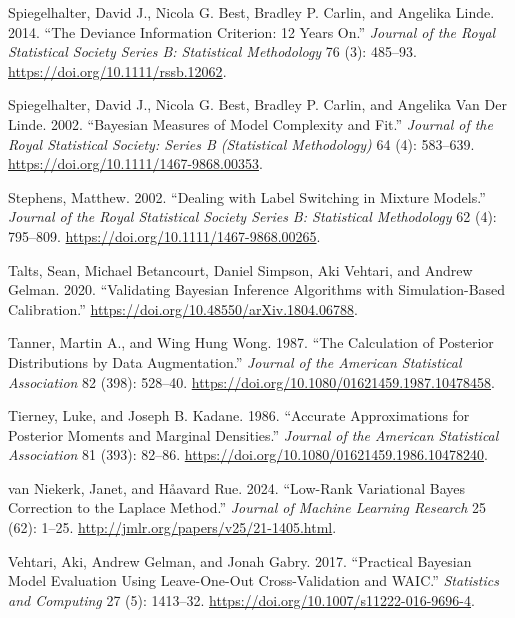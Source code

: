 \documentclass[
  11pt,
  letterpaper,
]{scrbook}
\newlength{\cslhangindent}
\newenvironment{CSLReferences}[2] %
 {\begin{list}{}{%
  \setlength{\itemindent}{0pt}
  \setlength{\leftmargin}{0pt}
  \setlength{\parsep}{0pt}
  \ifodd #1
   \setlength{\leftmargin}{\cslhangindent}
   \setlength{\itemindent}{-1\cslhangindent}
  \fi
  \setlength{\itemsep}{#2\baselineskip}}}
 {\end{list}}
\theoremstyle{plain}
\theoremstyle{plain}
\theoremstyle{definition}
\theoremstyle{definition}
\theoremstyle{definition}
\theoremstyle{plain}
\theoremstyle{remark}
\begin{document}
\begin{CSLReferences}{1}{0}
Spiegelhalter, David J., Nicola G. Best, Bradley P. Carlin, and Angelika
Linde. 2014. {``The Deviance Information Criterion: 12 Years On.''}
\emph{Journal of the Royal Statistical Society Series B: Statistical
Methodology} 76 (3): 485--93. \url{https://doi.org/10.1111/rssb.12062}.

Spiegelhalter, David J., Nicola G. Best, Bradley P. Carlin, and Angelika
Van Der Linde. 2002. {``Bayesian Measures of Model Complexity and
Fit.''} \emph{Journal of the Royal Statistical Society: Series B
(Statistical Methodology)} 64 (4): 583--639.
\url{https://doi.org/10.1111/1467-9868.00353}.

Stephens, Matthew. 2002. {``Dealing with Label Switching in Mixture
Models.''} \emph{Journal of the Royal Statistical Society Series B:
Statistical Methodology} 62 (4): 795--809.
\url{https://doi.org/10.1111/1467-9868.00265}.

Talts, Sean, Michael Betancourt, Daniel Simpson, Aki Vehtari, and Andrew
Gelman. 2020. {``Validating {B}ayesian Inference Algorithms with
Simulation-Based Calibration.''}
\url{https://doi.org/10.48550/arXiv.1804.06788}.

Tanner, Martin A., and Wing Hung Wong. 1987. {``The Calculation of
Posterior Distributions by Data Augmentation.''} \emph{Journal of the
American Statistical Association} 82 (398): 528--40.
\url{https://doi.org/10.1080/01621459.1987.10478458}.

Tierney, Luke, and Joseph B. Kadane. 1986. {``Accurate Approximations
for Posterior Moments and Marginal Densities.''} \emph{Journal of the
American Statistical Association} 81 (393): 82--86.
\url{https://doi.org/10.1080/01621459.1986.10478240}.

van Niekerk, Janet, and Håavard Rue. 2024. {``Low-Rank Variational
{B}ayes Correction to the {L}aplace Method.''} \emph{Journal of Machine
Learning Research} 25 (62): 1--25.
\url{http://jmlr.org/papers/v25/21-1405.html}.

Vehtari, Aki, Andrew Gelman, and Jonah Gabry. 2017. {``Practical
{B}ayesian Model Evaluation Using Leave-One-Out Cross-Validation and
{WAIC}.''} \emph{Statistics and Computing} 27 (5): 1413--32.
\url{https://doi.org/10.1007/s11222-016-9696-4}.


\end{CSLReferences}
\end{document}

